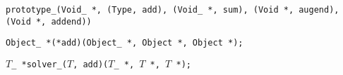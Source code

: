 
\tt{prototype_(Void_ *, (Type, add), (Void_ *, sum), (Void *, augend), (Void *, addend))}


\tt{Object_ *(*add)(Object_ *, Object *, Object *);}


$T$\tt{_ *solver_(}$T$\tt{, add)(}$T$\tt{_ *,} $T$ \tt{*,} $T$ \tt{*);}
